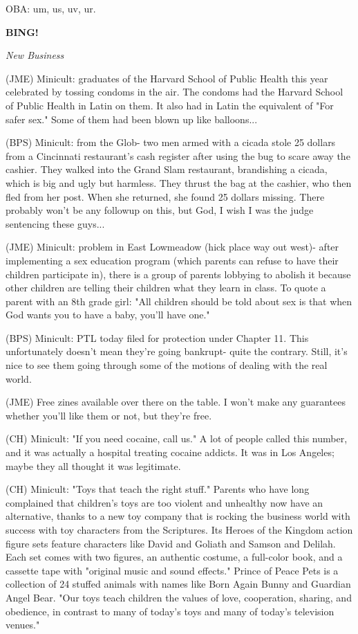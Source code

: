 \documentclass[12pt]{article}
\newcommand{\bing}{{\bf BING!} }
\newcommand{\goto}[1]{\bing \vskip 12pt \centerline{{\em{#1}}}}
\begin{document}
OBA: um, us, uv, ur.

\goto{New Business}

(JME) Minicult: graduates of the Harvard School of Public Health this year celebrated by tossing condoms in the air. The condoms had the Harvard School of Public Health in Latin on them. It also had in Latin the equivalent of "For safer sex." Some of them had been blown up like balloons...

(BPS) Minicult: from the Glob- two men armed with a cicada stole 25 dollars from a Cincinnati restaurant's cash register after using the bug to scare away the cashier. They walked into the Grand Slam restaurant, brandishing a cicada, which is big and ugly but harmless. They thrust the bag at the cashier, who then fled from her post. When she returned, she found 25 dollars missing. There probably won't be any followup on this, but God, I wish I was the judge sentencing these guys...

(JME) Minicult: problem in East Lowmeadow (hick place way out west)- after implementing a sex education program (which parents can refuse to have their children participate in), there is a group of parents lobbying to abolish it because other children are telling their children what they learn in class. To quote a parent with an 8th grade girl: "All children should be told about sex is that when God wants you to have a baby, you'll have one."

(BPS) Minicult: PTL today filed for protection under Chapter 11. This unfortunately doesn't mean they're going bankrupt- quite the contrary. Still, it's nice to see them going through some of the motions of dealing with the real world.

(JME) Free zines available over there on the table. I won't make any guarantees whether you'll like them or not, but they're free.

(CH) Minicult: "If you need cocaine, call us." A lot of people called this number, and it was actually a hospital treating cocaine addicts. It was in Los Angeles; maybe they all thought it was legitimate.

(CH) Minicult: "Toys that teach the right stuff." Parents who have long complained that children's toys are too violent and unhealthy now have an alternative, thanks to a new toy company that is rocking the business world with success with toy characters from the Scriptures. Its Heroes of the Kingdom action figure sets feature characters like David and Goliath and Samson and Delilah. Each set comes with two figures, an authentic costume, a full-color book, and a cassette tape with "original music and sound effects." Prince of Peace Pets is a collection of 24 stuffed animals with names like Born Again Bunny and Guardian Angel Bear. "Our toys teach children the values of love, cooperation, sharing, and obedience, in contrast to many of today's toys and many of today's television venues."
\end{document}

